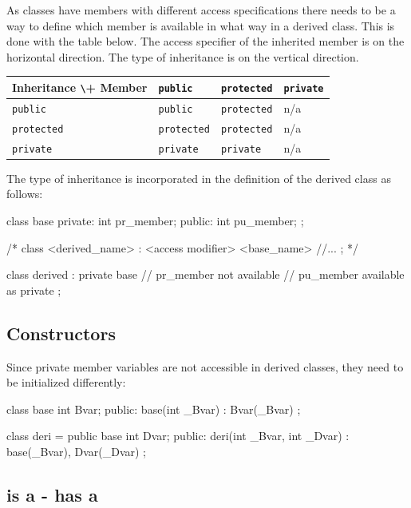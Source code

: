 \documentclass[10pt,a4paper]{scrartcl}
\begin{document}
\begin{multicols*}{2}
As classes have members with different access specifications there needs to be a way to define which member is available in what way in a derived class. This is done with the table below. The access specifier of the inherited member is on the horizontal direction. The type of inheritance is on the vertical direction.

\begin{center}
\begin{tabular}{|l|lll|}
\hline
Inheritance \verb+\+ Member & \verb+public+ & \verb+protected+ & \verb+private+\\\hline
\verb+public+&\verb+public+&\verb+protected+&n/a\\
\verb+protected+&\verb+protected+&\verb+protected+&n/a\\
\verb+private+&\verb+private+&\verb+private+&n/a\\\hline
\end{tabular}
\end{center}

The type of inheritance is incorporated in the definition of the derived class as follows:

\begin{TPCpp}
class base {
private:
	int pr_member;
public:
	int pu_member;
};

/*
class <derived_name> : <access modifier> <base_name> {
	//...
};
*/

class derived : private base {
	// pr_member not available
	// pu_member available as private
};
\end{TPCpp}

\subsection{Constructors}
\label{sec:ConstructorsInheritance}

Since private member variables are not accessible in derived classes, they need to be initialized differently:

\begin{TPCpp}
class base{
	int Bvar;
public:
	base(int _Bvar) : Bvar(_Bvar){}
};

class deri = public base {
	int Dvar;
public:
	deri(int _Bvar, int _Dvar) : base(_Bvar), Dvar(_Dvar) {}
};
\end{TPCpp}

\subsection{is a - has a}
\label{sec:IsAHasA}


\end{multicols*}
\end{document}
